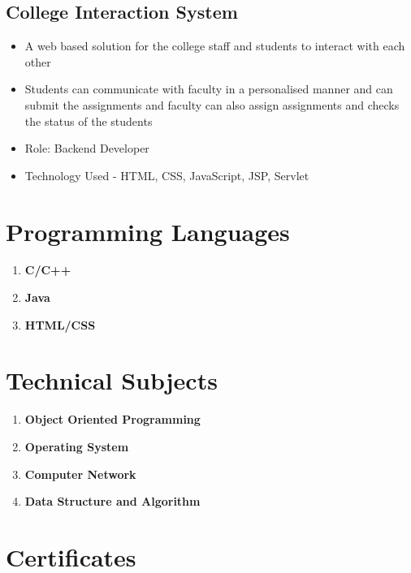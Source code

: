 \documentclass{article}[14pt]
\begin{document}
    
    \subsection{College Interaction System}
    \begin{itemize}
        \item {\normalsize A web based solution for the college staff and students to interact with each other}
        
        \item {\normalsize Students can communicate with faculty in a personalised manner and can submit the assignments and faculty can also assign assignments and checks the status of the students}

        \item {\normalsize Role: Backend Developer}
        \item {\normalsize Technology Used - HTML, CSS, JavaScript, JSP, Servlet}
    \end{itemize}
    
\section{Programming Languages}

\begin{enumerate}
    \item {\textbf {C/C++}}\cite{dos1996textual}
    \item {\textbf {Java}}\cite{haggan2004research}
    \item {\textbf {HTML/CSS}}
\end{enumerate}


\section{Technical Subjects}

\begin{enumerate}
    \item {\textbf {Object Oriented Programming}}
    \item {\textbf {Operating System}}
    \item {\textbf {Computer Network}}
    \item {\textbf {Data Structure and Algorithm}}
\end{enumerate}

\section{Certificates}
\end{document}
